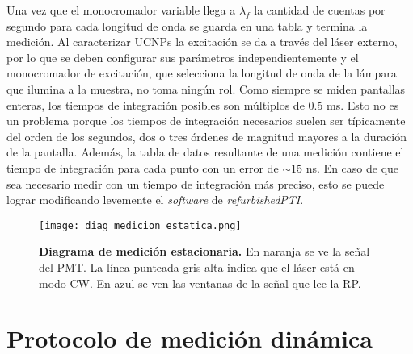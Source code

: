 \noindent Una vez que el monocromador variable llega a $\lambda_f$ la cantidad de cuentas por segundo para cada longitud de onda se guarda en una tabla y termina la medición.
Al caracterizar UCNPs la excitación se da a través del láser externo, por lo que se deben configurar sus parámetros independientemente y el monocromador de excitación, que selecciona la longitud de onda de la lámpara que ilumina a la muestra, no toma ningún rol.
Como siempre se miden pantallas enteras, los tiempos de integración posibles son múltiplos de 0.5 ms.
Esto no es un problema porque los tiempos de integración necesarios suelen ser típicamente del orden de los segundos, dos o tres órdenes de magnitud mayores a la duración de la pantalla.
Además, la tabla de datos resultante de una medición contiene el tiempo de integración para cada punto con un error de $\sim 15$ ns.
En caso de que sea necesario medir con un tiempo de integración más preciso, esto se puede lograr modificando levemente el \textit{software} de \textit{refurbishedPTI}.

\begin{SCfigure}
     \centering
     \texttt{[image: diag\_medicion\_estatica.png]}
     \caption{\textbf{Diagrama de medición estacionaria.} En naranja se ve la señal del PMT. La línea punteada gris alta indica que el láser está en modo CW. En azul se ven las ventanas de la señal que lee la RP.}
     \label{fig:diag_medicion_estatica}
\end{SCfigure}


\section{Protocolo de medición dinámica} \label{sec:proceso_dinamico}

